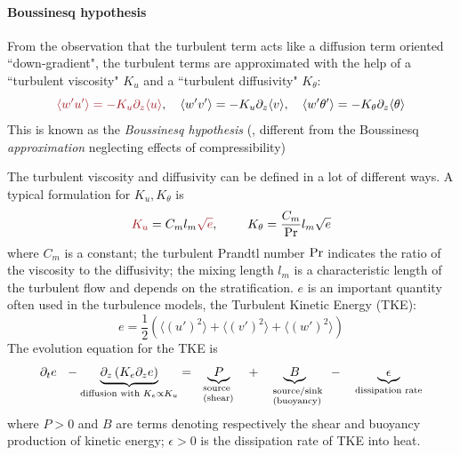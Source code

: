 \paragraph{Boussinesq hypothesis}
From the observation that the turbulent term acts like a diffusion
term oriented ``down-gradient", the turbulent terms are approximated
with the help of a ``turbulent viscosity" $K_u$ and a
``turbulent diffusivity" $K_\theta$:
\begin{equation}
\emphase{\langle w' u'\rangle =
	- K_u \partial_z \langle u \rangle}, ~~~
\langle w' v'\rangle = - K_u \partial_z \langle v \rangle, ~~~
\langle w' \theta'\rangle =
	- K_\theta \partial_z \langle \theta \rangle
\end{equation}
This is known as the \textit{Boussinesq hypothesis}
(\citep{boussinesq_theorie_1897},
different from the Boussinesq \textit{approximation} neglecting
effects of compressibility)
\par
The turbulent viscosity and diffusivity can be defined in a lot of
different ways. A typical formulation for $K_u, K_\theta$ is
\begin{equation}
	\emphase{K_u} = C_m l_m \emphase{\sqrt{e}}, ~~~~~~~ K_\theta = \frac{C_m}{\rm Pr}
	l_m \sqrt{e}
\end{equation}
where $C_m$ is a constant; the turbulent Prandtl number
${\rm Pr}$ indicates the ratio of the viscosity to the diffusivity;
the mixing length $l_m$ is a characteristic
length of the turbulent flow and depends on the stratification.
$e$ is an important quantity often used in the turbulence models,
the Turbulent Kinetic Energy (TKE):
\begin{equation}
	e = \frac{1}{2} \left(\langle (u')^2 \rangle + \langle (v')^2 \rangle
	+ \langle (w')^2 \rangle\right)
\end{equation}
The evolution equation for the TKE is
\begin{equation}
	\partial_t e ~~-
\underbrace{\partial_z \left(K_e
    \partial_z e\right)}_{\text{diffusion with } K_e \propto K_u}
    =
	~~\underbrace{P}_{\parbox{25pt}{\scriptsize{ source\\(shear)}}}
	~~~+~~~
	\underbrace{B}_{\parbox{35pt}{\scriptsize{ source/sink\\(buoyancy)}}}
	~~~-~~~
	\underbrace{\epsilon}_{\text{dissipation rate}}
\end{equation}
where $P>0$ and $B$ are terms denoting respectively
the shear and buoyancy production of kinetic energy;
$\epsilon>0$ is the dissipation rate of TKE
into heat.
\par
